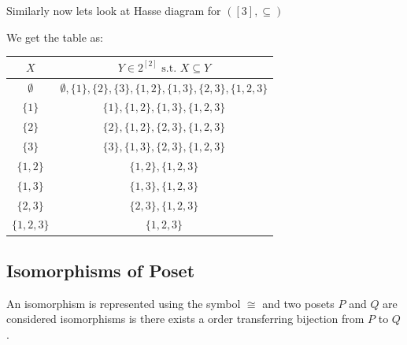 Similarly now lets look at Hasse diagram for $([3], \subseteq)$

We get the table as:
\begin{center}
  \begin{tabular}{ |c|c| }
    \hline
    $X$ & $Y \in 2^{[2]} \text{ s.t. } X \subseteq Y$\\
    \hline
    $\emptyset$ & $\emptyset, \{1\}, \{2\}, \{3\}, \{1, 2\}, \{1,
    3\}, \{2, 3\}, \{1, 2, 3\}$\\
    $\{1\}$ & $\{1\}, \{1, 2\}, \{1, 3\}, \{1, 2, 3\}$\\
    $\{2\}$ & $\{2\}, \{1, 2\}, \{2, 3\}, \{1, 2, 3\}$\\
    $\{3\}$ & $\{3\}, \{1, 3\}, \{2, 3\}, \{1, 2, 3\}$\\
    $\{1, 2\}$ & $\{1, 2\}, \{1, 2, 3\}$\\
    $\{1, 3\}$ & $\{1, 3\}, \{1, 2, 3\}$\\
    $\{2, 3\}$ & $\{2, 3\}, \{1, 2, 3\}$\\
    $\{1, 2, 3\}$ & $\{1, 2, 3\}$\\
    \hline
  \end{tabular}
\end{center}

\begin{tcolorbox}[colframe=orange!50, title = Hasse diagram of $2^X$]
  \begin{center}
  \end{center}
\end{tcolorbox}

\subsection{Isomorphisms of Poset}
An isomorphism is represented using the symbol $\cong$ and two posets
$P$ and $Q$ are considered
isomorphisms is there exists a order transferring bijection from $P$ to $Q$.

